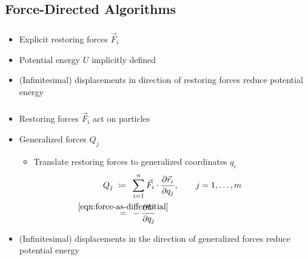 \subsection{Force-Directed Algorithms}
\label{subsect:force-directed-algorithms}

\begin{frame}
  \frametitle{\insertsubsection}
  \begin{itemize}
    \item Explicit restoring forces ${\vec{F}_i}$
    \item Potential energy ${U}$ implicitly defined
    \item (Infinitesimal) displacements in direction of restoring forces reduce potential energy
  \end{itemize}
\end{frame}

\begin{frame}
  \frametitle{\insertsubsection}
  \begin{itemize}
    \item Restoring forces ${\vec{F}_i}$ act on particles
    \item Generalized forces ${Q_j}$ \begin{itemize}
      \item Translate restoring forces to generalized coordinates ${q_i}$
      \begin{align}
        Q_j \;\coloneqq &\;\; \sum_{i=1}^{n}{\vec{F}_i \cdot \frac{\partial \vec{r}_i}{\partial q_j}}, \qquad j = 1, \ldots, m\\
        \;\stackrel{\mathclap{\eqref{eqn:force-as-differential}}}{=} &\;\; -\frac{\partial U}{\partial q_j}
      \end{align}
    \end{itemize}
    \item (Infinitesimal) displacements in the direction of generalized forces reduce potential energy
  \end{itemize}
\end{frame}
